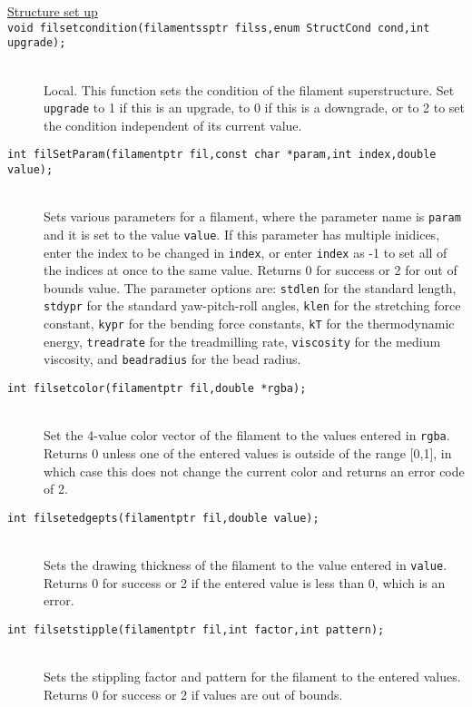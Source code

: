 \documentclass {scrbook}
\newcommand {\ttt} {\texttt}
\begin{document}
\begin{description}
\item[\underline{Structure set up}]

\item[\ttt{void filsetcondition(filamentssptr filss,enum StructCond cond,int upgrade);}]
\hfill \\
Local. This function sets the condition of the filament superstructure. Set \ttt{upgrade} to 1 if this is an upgrade, to 0 if this is a downgrade, or to 2 to set the condition independent of its current value.

\item[\ttt{int filSetParam(filamentptr fil,const char *param,int index,double value);}]
\hfill \\
Sets various parameters for a filament, where the parameter name is \ttt{param} and it is set to the value \ttt{value}. If this parameter has multiple inidices, enter the index to be changed in \ttt{index}, or enter \ttt{index} as -1 to set all of the indices at once to the same value. Returns 0 for success or 2 for out of bounds value. The parameter options are: \ttt{stdlen} for the standard length, \ttt{stdypr} for the standard yaw-pitch-roll angles, \ttt{klen} for the stretching force constant, \ttt{kypr} for the bending force constants, \ttt{kT} for the thermodynamic energy, \ttt{treadrate} for the treadmilling rate, \ttt{viscosity} for the medium viscosity, and \ttt{beadradius} for the bead radius.

\item[\ttt{int filsetcolor(filamentptr fil,double *rgba);}]
\hfill \\
Set the 4-value color vector of the filament to the values entered in \ttt{rgba}. Returns 0 unless one of the entered values is outside of the range [0,1], in which case this does not change the current color and returns an error code of 2.

\item[\ttt{int filsetedgepts(filamentptr fil,double value);}]
\hfill \\
Sets the drawing thickness of the filament to the value entered in \ttt{value}. Returns 0 for success or 2 if the entered value is less than 0, which is an error.

\item[\ttt{int filsetstipple(filamentptr fil,int factor,int pattern);}]
\hfill \\
Sets the stippling factor and pattern for the filament to the entered values. Returns 0 for success or 2 if values are out of bounds.


\end{description}
\end{document}
